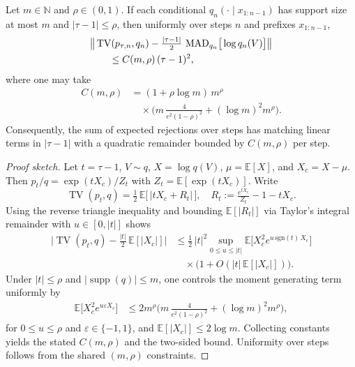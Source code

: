 \begin{theorem}\label{thm:second-order-temp-law}\sloppy
Let $m\in\mathbb{N}$ and $\rho\in(0,1)$. If each conditional $q_n(\cdot\mid x_{1:n-1})$ has support size at most $m$ and $|\tau-1|\le \rho$, then uniformly over steps $n$ and prefixes $x_{1:n-1}$,
\[
\begin{aligned}
&\big\|\operatorname{TV}(p_{\tau,n},q_n)
-\tfrac{|\tau-1|}{2}\,\operatorname{MAD}_{q_n}\!\big[\log q_n(V)\big]\big\|\\
&\qquad\le C(m,\rho)\,(\tau-1)^2,
\end{aligned}
\]
where one may take
\[
\begin{aligned}
C(m,\rho)
&=(1+\rho\log m)\,m^{\rho}\\
&\quad\times\Big(m\,\tfrac{4}{e^2(1-\rho)^2}+ (\log m)^2 m^{\rho}\Big).
\end{aligned}
\]
Consequently, the sum of expected rejections over steps has matching linear terms in $|\tau-1|$ with a quadratic remainder bounded by $C(m,\rho)$ per step.
\end{theorem}

\begin{proof}[Proof sketch]
Let $t=\tau-1$, $V\sim q$, $X=\log q(V)$, $\mu=\mathbb E[X]$, and $X_c=X-\mu$. Then $p_t/q=\exp(tX_c)/Z_t$ with $Z_t=\mathbb E[\exp(tX_c)]$. Write
\[
\operatorname{TV}(p_t,q)=\tfrac12\,\mathbb E\big[\,|tX_c+R_t|\,\big],\quad R_t:=\tfrac{e^{tX_c}}{Z_t}-1-tX_c.
\]
Using the reverse triangle inequality and bounding $\mathbb E[|R_t|]$ via Taylor's integral remainder with $u\in[0,|t|]$ shows
\[
\begin{aligned}
\Big|\operatorname{TV}(p_t,q)-\tfrac{|t|}{2}\,\mathbb E[|X_c|]\Big|
&\le \tfrac12\,|t|^2\sup_{0\le u\le |t|}\mathbb E\big[X_c^2 e^{u\,\mathrm{sgn}(t)\, X_c}\big]\\
&\quad\times\big(1+O(|t|\,\mathbb E[|X_c|])\big).
\end{aligned}
\]
Under $|t|\le\rho$ and $|\operatorname{supp}(q)|\le m$, one controls the moment generating term uniformly by
\[
\begin{aligned}
\mathbb E\big[X_c^2 e^{u\varepsilon X_c}\big]
&\le 2 m^{\rho}\Big(m\,\tfrac{4}{e^2(1-\rho)^2}+(\log m)^2 m^{\rho}\Big),
\end{aligned}
\]
for $0\le u\le\rho$ and $\varepsilon\in\{-1,1\}$, and $\mathbb E[|X_c|]\le 2\log m$. Collecting constants yields the stated $C(m,\rho)$ and the two-sided bound. Uniformity over steps follows from the shared $(m,\rho)$ constraints.\qedhere
\end{proof}

